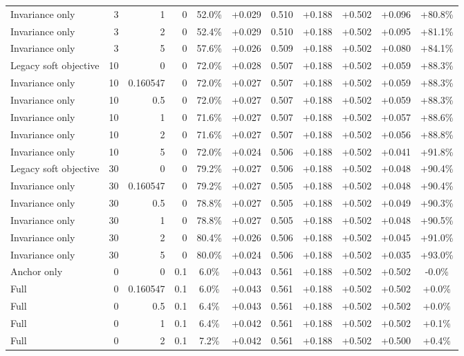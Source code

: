 \begin{table}[htbp]
\begin{tabular}{lrrrccccccc}
Invariance only & 3 & 1 & 0 & 52.0\% & +0.029 & 0.510 & +0.188 & +0.502 & +0.096 & +80.8\% \\
Invariance only & 3 & 2 & 0 & 52.4\% & +0.029 & 0.510 & +0.188 & +0.502 & +0.095 & +81.1\% \\
Invariance only & 3 & 5 & 0 & 57.6\% & +0.026 & 0.509 & +0.188 & +0.502 & +0.080 & +84.1\% \\
Legacy soft objective & 10 & 0 & 0 & 72.0\% & +0.028 & 0.507 & +0.188 & +0.502 & +0.059 & +88.3\% \\
Invariance only & 10 & 0.160547 & 0 & 72.0\% & +0.027 & 0.507 & +0.188 & +0.502 & +0.059 & +88.3\% \\
Invariance only & 10 & 0.5 & 0 & 72.0\% & +0.027 & 0.507 & +0.188 & +0.502 & +0.059 & +88.3\% \\
Invariance only & 10 & 1 & 0 & 71.6\% & +0.027 & 0.507 & +0.188 & +0.502 & +0.057 & +88.6\% \\
Invariance only & 10 & 2 & 0 & 71.6\% & +0.027 & 0.507 & +0.188 & +0.502 & +0.056 & +88.8\% \\
Invariance only & 10 & 5 & 0 & 72.0\% & +0.024 & 0.506 & +0.188 & +0.502 & +0.041 & +91.8\% \\
Legacy soft objective & 30 & 0 & 0 & 79.2\% & +0.027 & 0.506 & +0.188 & +0.502 & +0.048 & +90.4\% \\
Invariance only & 30 & 0.160547 & 0 & 79.2\% & +0.027 & 0.505 & +0.188 & +0.502 & +0.048 & +90.4\% \\
Invariance only & 30 & 0.5 & 0 & 78.8\% & +0.027 & 0.505 & +0.188 & +0.502 & +0.049 & +90.3\% \\
Invariance only & 30 & 1 & 0 & 78.8\% & +0.027 & 0.505 & +0.188 & +0.502 & +0.048 & +90.5\% \\
Invariance only & 30 & 2 & 0 & 80.4\% & +0.026 & 0.506 & +0.188 & +0.502 & +0.045 & +91.0\% \\
Invariance only & 30 & 5 & 0 & 80.0\% & +0.024 & 0.506 & +0.188 & +0.502 & +0.035 & +93.0\% \\
Anchor only & 0 & 0 & 0.1 & 6.0\% & +0.043 & 0.561 & +0.188 & +0.502 & +0.502 & -0.0\% \\
Full & 0 & 0.160547 & 0.1 & 6.0\% & +0.043 & 0.561 & +0.188 & +0.502 & +0.502 & +0.0\% \\
Full & 0 & 0.5 & 0.1 & 6.4\% & +0.043 & 0.561 & +0.188 & +0.502 & +0.502 & +0.0\% \\
Full & 0 & 1 & 0.1 & 6.4\% & +0.042 & 0.561 & +0.188 & +0.502 & +0.502 & +0.1\% \\
Full & 0 & 2 & 0.1 & 7.2\% & +0.042 & 0.561 & +0.188 & +0.502 & +0.500 & +0.4\% \\

\end{tabular}
\end{table}
